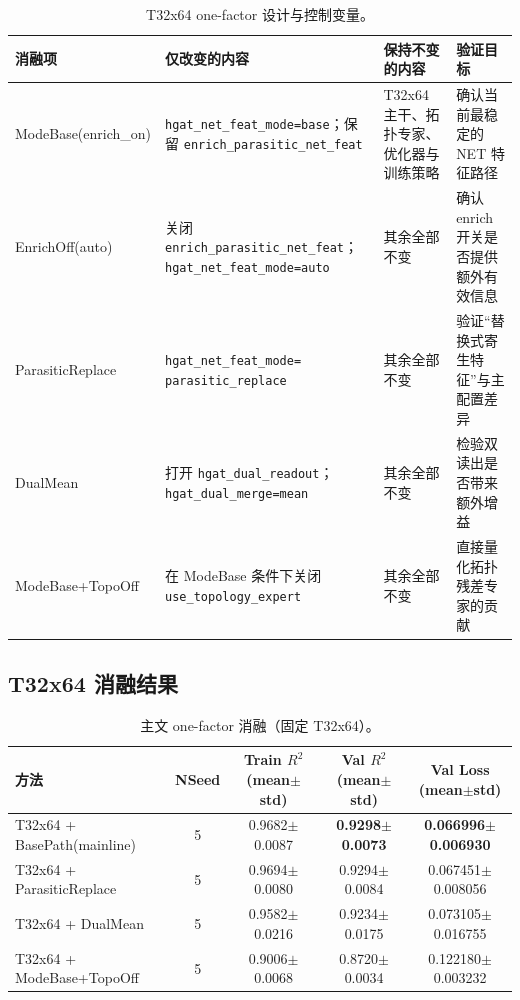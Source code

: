 \documentclass[12pt,a4paper]{ctexart}
\begin{document}
\begin{table}[htbp]
\centering
\scriptsize
\setlength{\tabcolsep}{3pt}
\renewcommand{\arraystretch}{1.15}
\begin{tabularx}{\linewidth}{L{3.0cm}L{3.8cm}L{3.8cm}X}
\toprule
消融项 & 仅改变的内容 & 保持不变的内容 & 验证目标 \\
\midrule
ModeBase(enrich\_on) &
\texttt{hgat\_net\_feat\_mode=base}；保留 \texttt{enrich\_parasitic\_net\_feat} &
T32x64 主干、拓扑专家、优化器与训练策略 &
确认当前最稳定的 NET 特征路径 \\

EnrichOff(auto) &
关闭 \texttt{enrich\_parasitic\_net\_feat}；\texttt{hgat\_net\_feat\_mode=auto} &
其余全部不变 &
确认 enrich 开关是否提供额外有效信息 \\

ParasiticReplace &
\texttt{hgat\_net\_feat\_mode=}\newline
\texttt{parasitic\_replace} &
其余全部不变 &
验证“替换式寄生特征”与主配置差异 \\

DualMean &
打开 \texttt{hgat\_dual\_readout}；\texttt{hgat\_dual\_merge=mean} &
其余全部不变 &
检验双读出是否带来额外增益 \\

ModeBase+TopoOff &
在 ModeBase 条件下关闭 \texttt{use\_topology\_expert} &
其余全部不变 &
直接量化拓扑残差专家的贡献 \\
\bottomrule
\end{tabularx}
\renewcommand{\arraystretch}{1}
\caption{T32x64 one-factor 设计与控制变量。}
\label{tab:t32_design_cn}
\end{table}

\subsection{T32x64 消融结果}
\begin{table}[htbp]
\centering
\footnotesize
\setlength{\tabcolsep}{4pt}
\begin{tabular}{L{4.3cm}c c c c}
\toprule
方法 & NSeed & Train $R^2$ (mean$\pm$std) & Val $R^2$ (mean$\pm$std) & Val Loss (mean$\pm$std) \\
\midrule
T32x64 + BasePath(mainline) & 5 & 0.9682$\pm$0.0087 & \textbf{0.9298$\pm$0.0073} & \textbf{0.066996$\pm$0.006930} \\
T32x64 + ParasiticReplace & 5 & 0.9694$\pm$0.0080 & 0.9294$\pm$0.0084 & 0.067451$\pm$0.008056 \\
T32x64 + DualMean & 5 & 0.9582$\pm$0.0216 & 0.9234$\pm$0.0175 & 0.073105$\pm$0.016755 \\
T32x64 + ModeBase+TopoOff & 5 & 0.9006$\pm$0.0068 & 0.8720$\pm$0.0034 & 0.122180$\pm$0.003232 \\
\bottomrule
\end{tabular}
\caption{主文 one-factor 消融（固定 T32x64）。}
\label{tab:t32_ablation_cn}
\end{table}
\end{document}
